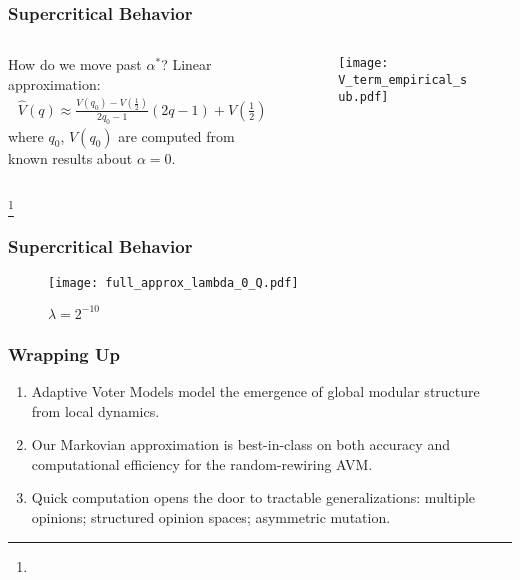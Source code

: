 \documentclass{beamer}
\newcommand\blfootnote[1]{%
  \begingroup
  \renewcommand\thefootnote{}\footnote{#1}%
  \addtocounter{footnote}{-1}%
  \endgroup
}
\begin{document}
		\begin{frame}\frametitle{Supercritical Behavior}
			\begin{columns}
				\begin{column}{0.6\textwidth}
					How do we move past $\alpha^*$? Linear approximation:  
					\begin{align*}
						\hat{V}(q) \approx \frac{V(q_0) - V\left(\frac{1}{2}\right)}{2q_0 -1}(2q - 1) + V\left(\frac{1}{2}\right)
					\end{align*}
					where $q_0$, $V(q_0)$ are computed from known results about $\alpha = 0$.		
				\end{column}
				\begin{column}{0.4\textwidth}
					\begin{figure}
						\centering
						\texttt{[image: V\_term\_empirical\_sub.pdf]}
						\caption{} \label{fig:}
					\end{figure}
				\end{column}
			\end{columns}
			\blfootnote{}
		\end{frame}
	
		
		\begin{frame}\frametitle{Supercritical Behavior}
		  	\begin{figure}
		  		\centering
		  		\texttt{[image: full\_approx\_lambda\_0\_Q.pdf]}
		  		\caption{$\lambda = 2^{-10}$} \label{fig:}
		  	\end{figure}
		\end{frame}	
		
		\begin{frame}\frametitle{Wrapping Up}
			\begin{enumerate}
			  	\item Adaptive Voter Models model the emergence of global modular structure from local dynamics.
			  	\item Our Markovian approximation is best-in-class on both accuracy and computational efficiency for the random-rewiring AVM. 
			  	\item Quick computation opens the door to tractable generalizations: multiple opinions; structured opinion spaces;  asymmetric mutation. 
		  	\end{enumerate}  
		\end{frame}
	
\end{document}
